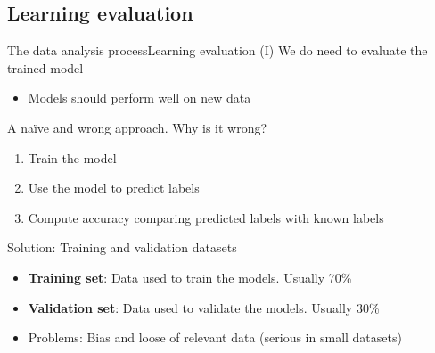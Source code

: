 \documentclass[10pt,compress]{beamer} %
\begin{document}
\subsection{Learning evaluation}
\begin{frame}{The data analysis process}{Learning evaluation (I)}
	We do need to evaluate the trained model
	\begin{itemize}
		\item Models should perform well on new data
	\end{itemize}
	A na\"ive and wrong approach. Why is it wrong?
	\begin{enumerate}
		\item Train the model
		\item Use the model to predict labels
		\item Compute accuracy comparing predicted labels with known labels
	\end{enumerate}
	Solution: Training and validation datasets
	\begin{itemize}
		\item \textbf{Training set}: Data used to train the models. Usually 70\%
		\item \textbf{Validation set}: Data used to validate the models. Usually 30\%
		\item Problems: Bias and loose of relevant data (serious in small datasets)
	\end{itemize}
\end{frame}
\end{document}
